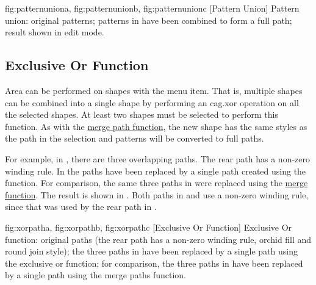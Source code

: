 {
  {fig:patternuniona}{}{},
  {fig:patternunionb}{}{},
  {fig:patternunionc}{}{}
}
[Pattern Union]
{Pattern union:  original patterns;
 patterns in
 have been combined to form a full
path;  result shown in edit mode.}


\subsection{Exclusive Or Function}\label{sec:xorpath}


Area  can be performed on \glspl{shape} with
the  menu item. That is, multiple \glspl{shape}
can be combined into a single \gls*{shape} by performing an
\gls{cag.xor} operation on all the selected \glspl*{shape}.  At
least two \glspl*{shape} must be selected to perform this function.
As with the \hyperref[sec:mergepaths]{merge path function}, the new
\gls*{shape} has the same styles as the 
path in the selection and \glspl{pattern} will be converted to full
\glspl{path}.

For example, in , there are three
overlapping paths.  The rear path has a non-zero winding rule. In
 the paths have been replaced by a
single path created using the  function. For comparison,
the same three paths in  were replaced
using the \hyperref[sec:mergepaths]{merge function}. The result is
shown in . Both paths in
 and  use
a non-zero winding rule, since that was used by the rear path in
.

{
 {fig:xorpatha}{}{},
 {fig:xorpathb}{}{},
 {fig:xorpathc}{}{}
}
[Exclusive Or Function]
{Exclusive Or function: 
 original paths (the rear path has 
a non-zero winding rule, orchid
fill  and round join style);
 the three paths in
 have been replaced by 
a single path using the exclusive or function; 
 for comparison, the three paths in
 have been replaced by 
a single path using the merge paths function.}

